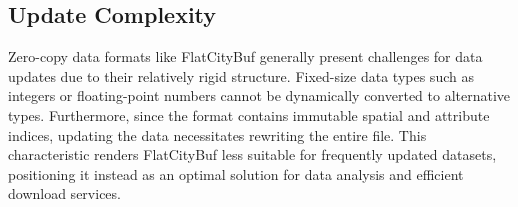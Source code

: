 \subsection{Update Complexity}
\label{ease_of_update}

Zero-copy data formats like FlatCityBuf generally present challenges for data updates due to their relatively rigid structure. Fixed-size data types such as integers or floating-point numbers cannot be dynamically converted to alternative types. Furthermore, since the format contains immutable spatial and attribute indices, updating the data necessitates rewriting the entire file. This characteristic renders FlatCityBuf less suitable for frequently updated datasets, positioning it instead as an optimal solution for data analysis and efficient download services.
